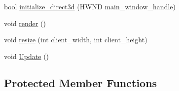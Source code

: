 \begin{DoxyCompactItemize}
\item 
bool \hyperlink{class_direct_x_renderer_a0d6aef4c838ac765f726391ee65c346c_a0d6aef4c838ac765f726391ee65c346c}{initialize\+\_\+direct3d} (H\+W\+ND main\+\_\+window\+\_\+handle)
\item 
void \hyperlink{class_direct_x_renderer_a2f3ecabf3d5e9d76b7754d66a6a346d3_a2f3ecabf3d5e9d76b7754d66a6a346d3}{render} ()
\item 
void \hyperlink{class_direct_x_renderer_ae823daf9d77db0f506320f7171cb117d_ae823daf9d77db0f506320f7171cb117d}{resize} (int client\+\_\+width, int client\+\_\+height)
\item 
void \hyperlink{class_direct_x_renderer_af1bd5f83975a5f0fb1735b3a6e933656_af1bd5f83975a5f0fb1735b3a6e933656}{Update} ()
\end{DoxyCompactItemize}
\subsection*{Protected Member Functions}
